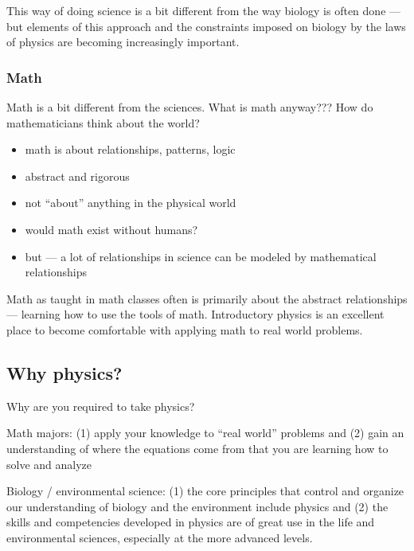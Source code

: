 This way of doing science is a bit different from the way biology is often done --- but elements of this approach and the constraints imposed on biology by the laws of physics are becoming increasingly important.

\subsubsection{Math}
Math is a bit different from the sciences. What is math anyway??? How do mathematicians think about the world?

\begin{itemize}
  \item math is about relationships, patterns, logic
  \item abstract and rigorous
  \item not ``about'' anything in the physical world
  \item would math exist without humans?
  \item but --- a lot of relationships in science can be modeled by mathematical relationships
\end{itemize}

Math as taught in math classes often is primarily about the abstract relationships --- learning how to use the tools of math. Introductory physics is an excellent place to become comfortable with applying math to real world problems.


\subsection{Why physics?}
Why are you required to take physics?

Math majors: (1) apply your knowledge to ``real world'' problems and (2) gain an understanding of where the equations come from that you are learning how to solve and analyze

Biology / environmental science: (1) the core principles that control and organize our understanding of biology and the environment include physics and (2) the skills and competencies developed in physics are of great use in the life and environmental sciences, especially at the more advanced levels.

